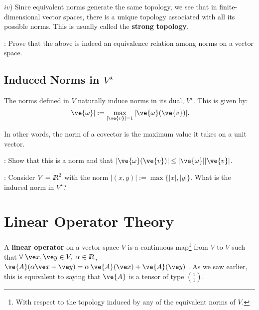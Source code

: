 \noi $iv$) Since equivalent norms generate the same topology, we see that in finite-dimensional vector spaces, there is a unique topology associated with all its possible norms. This is usually called the {\bf strong topology}.

\ejer: Prove that the above is indeed an equivalence relation among norms on a vector space.


\subsection{Induced Norms in $V^{\star}$}


The norms defined in $V$ naturally induce norms in its dual, $V^{\star}$. This is given by: \begin{equation} \label{eq:norma_inducida_en_dual} |\ve{\omega}| := \max_{|\ve{v}|=1}{|\ve{\omega}(\ve{v})|}. \end{equation} 

In other words, the norm of a covector is the maximum value it takes on a unit vector.
\espa

\ejer: Show that this is a norm and that $|\ve{\omega}(\ve{v})| \leq |\ve{\omega}||\ve{v}|$.

\ejer: Consider $V=\mbox{\sl {l$\!\!\!\;\:\!$R}}^2$ with the norm $|(x,y)|:= \max\{|x|,|y|\}$. What is the induced norm in $V^{\star}$?



\section{Linear Operator Theory}
\label{Teoria_de_Operadores_Lineales}


A {\bf linear operator}  
 on a vector space $V$ is a continuous map\footnote{With respect to the topology induced by any of the equivalent norms of $V$.}
from $V$ to $V$ such that $\forall \; \ve x,\ve y \in V,\; \alpha \in \re$, 
$\ve{A}(\alpha \ve x+ \ve y)=\alpha\,\ve{A}(\ve x) + \ve{A}(\ve y)\;$. As we saw earlier, this is equivalent to saying that $\ve{A}$ is a tensor of type ${1 \choose 1}$.

